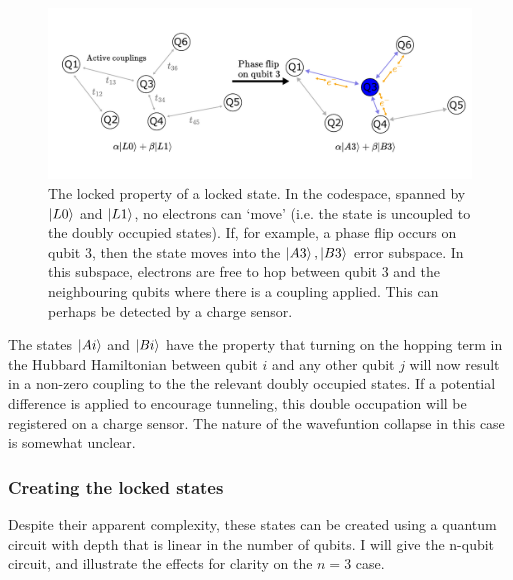 \documentclass{report}
\begin{document}
\begin{appendices}
\begin{figure}[ht]
    \centering
    \includegraphics[scale = 0.8]{Figures/locked_states.pdf}
    \caption{The locked property of a locked state. In the codespace, spanned by $\ket{L0}$ and $\ket{L1}$, no electrons can `move' (i.e. the state is uncoupled to the doubly occupied states). If, for example, a phase flip occurs on qubit 3, then the state moves into the $\ket{A3}, \ket{B3}$ error subspace. In this subspace, electrons are free to hop between qubit 3 and the neighbouring qubits where there is a coupling applied. This can perhaps be detected by a charge sensor.
    }\label{fig:lockedstates}
\end{figure}

The states $\ket{Ai}$ and $\ket{Bi}$ have the property that turning on the hopping term in the Hubbard Hamiltonian between qubit $i$ and any other qubit $j$ will now result in a non-zero coupling to the the relevant doubly occupied states. If a potential difference is applied to encourage tunneling, this double occupation will be registered on a charge sensor. The nature of the wavefuntion collapse in this case is somewhat unclear.
\subsubsection{Creating the locked states}
Despite their apparent complexity, these states can be created using a quantum circuit with depth that is linear in the number of qubits. I will give the n-qubit circuit, and illustrate the effects for clarity on the $n = 3$ case.


\end{appendices}
\end{document}
